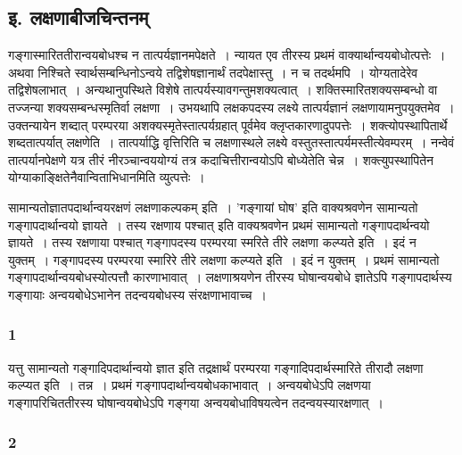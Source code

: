 		\subsection{इ. लक्षणाबीजचिन्तनम्}
			
				\begin{small}
			
					गङ्गास्मारिततीरान्वयबोधश्च न तात्पर्यज्ञानमपेक्षते~। न्यायत एव तीरस्य प्रथमं वाक्यार्थान्वयबोधोत्पत्तेः~। अथवा निश्चिते स्वार्थसम्बन्धिनोऽन्वये तद्विशेषज्ञानार्थं तदपेक्षास्तु~। न च तदर्थमपि~। योग्यतादेरेव तद्विशेषलाभात्~। अन्यथानुपस्थिते विशेषे तात्पर्यस्यावगन्तुमशक्यत्वात्~। शक्तिस्मारितशक्यसम्बन्धो वा तज्जन्या शक्यसम्बन्धस्मृतिर्वा लक्षणा~। उभयथापि लक्षकपदस्य लक्ष्ये तात्पर्यज्ञानं लक्षणायामनुपयुक्तमेव~। उक्तन्यायेन शब्दात् परम्परया अशक्यस्मृतेस्तात्पर्यग्रहात् पूर्वमेव क्लृप्तकारणादुपपत्तेः~। शक्त्योपस्थापितार्थे शब्दतात्पर्यात् लक्षणेति~। तात्पर्याद्धि वृत्तिरिति च लक्षणास्थले लक्ष्ये वस्तुतस्तात्पर्यमस्तीत्येवम्परम्~। नन्वेवं तात्पर्यानपेक्षणे यत्र तीरं नीरञ्चान्वययोग्यं तत्र कदाचित्तीरान्वयोऽपि बोध्येतेति चेन्न~। शक्त्युपस्थापितेन योग्याकाङ्क्षितेनैवान्विताभिधानमिति व्युत्पत्तेः~। 
				\end{small}
		
				सामान्यतोज्ञातपदार्थान्वयरक्षणं लक्षणाकल्पकम् इति~। ’गङ्गायां घोष’ इति वाक्यश्रवणेन सामान्यतो गङ्गापदार्थान्वयो ज्ञायते~। तस्य रक्षणाय पश्चात् इति वाक्यश्रवणेन प्रथमं सामान्यतो गङ्गापदार्थन्वयो ज्ञायते~। तस्य रक्षणाया पश्चात् गङ्गापदस्य परम्परया स्मरिते तीरे लक्षणा कल्प्यते इति~। इदं न युक्तम्~। गङ्गापदस्य परम्परया स्मारिरे तीरे लक्षणा कल्प्यते इति~। इदं न युक्तम्~। प्रथमं सामान्यतो गङ्गापदार्थान्वयबोधस्योत्पत्तौ कारणाभावात्~। लक्षणाश्रयणेन तीरस्य घोषान्वयबोधे ज्ञातेऽपि  गङ्गापदार्थस्य गङ्गायाः अन्वयबोधेऽभानेन तदन्वयबोधस्य संरक्षणाभावाच्च~।

			\subsubsection{1}

				\begin{small}
				
					यत्तु सामान्यतो गङ्गादिपदार्थान्वयो ज्ञात इति तद्रक्षार्थं परम्परया गङ्गादिपदार्थस्मारिते तीरादौ लक्षणा कल्प्यत इति~। तन्न~। प्रथमं गङ्गापदार्थान्वयबोधकाभावात्~। अन्वयबोधेऽपि लक्षणया गङ्गापरिचिततीरस्य घोषान्वयबोधेऽपि गङ्गया अन्वयबोधाविषयत्वेन तदन्वयस्यारक्षणात्~। 
				\end{small}

			\subsubsection{2}
			
